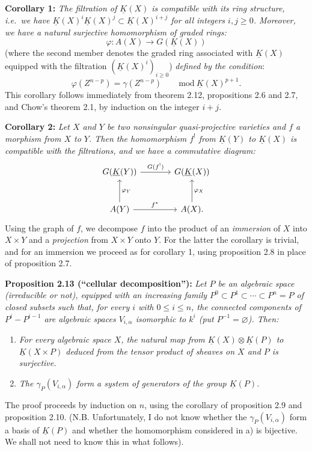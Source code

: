 \textbf{Corollary 1:} \emph{The filtration of $\underline K(X)$ is compatible with its ring structure, i.e.\ we have $\underline K(X)^i\underline K(X)^j\subset\underline K(X)^{i+j}$ for all integers $i,j\geq0$. Moreover, we have a natural surjective homomorphism of graded rings:}
\begin{equation}\tag{2.34}
 \varphi:A(X)\longrightarrow G(\underline K(X))
\end{equation}
(where the second member denotes the graded ring associated with $\underline K(X)$ equipped with the filtration $(\underline K(X)^i)_{i\geq0}$) \emph{defined by the condition}:
\[
 \varphi(Z^{n-p})=\gamma(Z^{n-p})\qquad\mathrm{mod}\ \underline K(X)^{p+1}.
\]
This corollary follows immediately from theorem 2.12, propositions 2.6 and 2.7, and Chow's theorem 2.1, by induction on the integer $i+j$.

\textbf{Corollary 2:} \emph{Let $X$ and $Y$ be two nonsingular quasi-projective varieties and $f$ a morphism from $X$ to $Y$. Then the homomorphism $f^!$ from $\underline K(Y)$ to $\underline K(X)$ is compatible with the filtrations, and we have a commutative diagram:}
\[
\begin{tikzcd}[column sep=large,row sep=large]
G(\underline K(Y)) \arrow[r,"G(f^!)"] & G(\underline K(X))\\
A(Y) \arrow[r,"f^*"] \arrow[u,"\varphi_Y"'] & A(X) \arrow[u,"\varphi_X"'] .
\end{tikzcd}
\]
%
Using the graph of $f$, we decompose $f$ into the product of an \emph{immersion} of $X$ into $X\times Y$ and a \emph{projection} from $X\times Y$ onto $Y$. For the latter the corollary is trivial, and for an immersion we proceed as for corollary 1, using proposition 2.8 in place of proposition 2.7.

\textbf{Proposition 2.13 (``cellular decomposition''):} \emph{Let $P$ be an algebraic space (irreducible or not), equipped with an increasing family $P^0\subset P^1\subset\cdots\subset P^n=P$ of closed subsets such that, for every $i$ with $0\leq i\leq n$, the connected components of $P^i-P^{i-1}$ are algebraic spaces $V_{i,\alpha}$ isomorphic to $k^i$ (put $P^{-1}=\varnothing$). Then:}
\begin{enumerate}[label=\alph*)]
\item \emph{For every algebraic space $X$, the natural map from $\underline K(X)\otimes\underline K(P)$ to $\underline K(X\times P)$ deduced from the tensor product of sheaves on $X$ and $P$ is surjective.}
\item \emph{The $\gamma_P(V_{i,\alpha})$ form a system of generators of the group $\underline K(P)$.}
\end{enumerate}
The proof proceeds by induction on $n$, using the corollary of proposition 2.9 and proposition 2.10. (N.B. Unfortunately, I do not know whether the $\gamma_P(V_{i,\alpha})$ form a basis of $\underline K(P)$ and whether the homomorphism considered in a) is bijective. We shall not need to know this in what follows).

